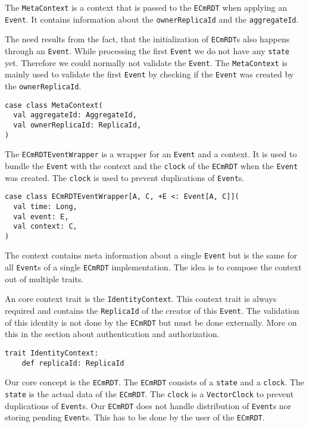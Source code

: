\documentclass[
	ngerman,
	ruledheaders=section,   %
	class=report,		    %
	thesis={type=bachelor}, %
	accentcolor=9c,			%
	custommargins=false,    %
	marginpar=false,        %
	parskip=half-,          %
	fontsize=11pt,          %
]{tudapub}
\let\code\texttt
\begin{document}
The \code{MetaContext} is a context that is passed to the \code{ECmRDT} when applying an \code{Event}. It contains information about the \code{ownerReplicaId} and the \code{aggregateId}. 

The need results from the fact, that the initialization of \code{ECmRDT}s also happens through an \code{Event}. While processing the first \code{Event} we do not have any \code{state} yet. Therefore we could normally not validate the \code{Event}. The \code{MetaContext} is mainly used to validate the first \code{Event} by checking if the \code{Event} was created by the \code{ownerReplicaId}.

\begin{lstlisting}
case class MetaContext(
  val aggregateId: AggregateId,
  val ownerReplicaId: ReplicaId,
)
\end{lstlisting}

The \code{ECmRDTEventWrapper} is a wrapper for an \code{Event} and a context. It is used to bundle the \code{Event} with the context and the \code{clock} of the \code{ECmRDT} when the \code{Event} was created. The \code{clock} is used to prevent duplications of \code{Event}s.

\begin{lstlisting}
case class ECmRDTEventWrapper[A, C, +E <: Event[A, C]](
  val time: Long,
  val event: E,
  val context: C,
)
\end{lstlisting}

The context contains meta information about a single \code{Event} but is the same for all \code{Event}s of a single \code{ECmRDT} implementation. The idea is to compose the context out of multiple traits.

An core context trait is the \code{IdentityContext}. This context trait is always required and contains the \code{ReplicaId} of the creator of this \code{Event}. The validation of this identity is not done by the \code{ECmRDT} but must be done externally. More on this in the section about authentication and authorization.

\begin{lstlisting}
trait IdentityContext:
	def replicaId: ReplicaId
\end{lstlisting}

Our core concept is the \code{ECmRDT}. The \code{ECmRDT} consists of a \code{state} and a \code{clock}. The \code{state} is the actual data of the \code{ECmRDT}. The \code{clock} is a \code{VectorClock} to prevent duplications of \code{Event}s. Our \code{ECmRDT} does not handle distribution of \code{Event}s nor storing pending \code{Event}s. This has to be done by the user of the \code{ECmRDT}.
\end{document}
